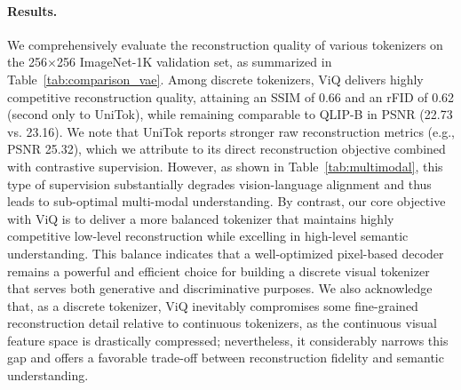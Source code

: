 \paragraph{Results.}
We comprehensively evaluate the reconstruction quality of various tokenizers on the 256$\times$256 ImageNet-1K validation set, as summarized in Table~\ref{tab:comparison_vae}.
Among discrete tokenizers, ViQ delivers highly competitive reconstruction quality, attaining an SSIM of 0.66 and an rFID of 0.62 (second only to UniTok), while remaining comparable to QLIP-B in PSNR (22.73 vs. 23.16). We note that UniTok reports stronger raw reconstruction metrics (e.g., PSNR 25.32), which we attribute to its direct reconstruction objective combined with contrastive supervision. However, as shown in Table~\ref{tab:multimodal}, this type of supervision substantially degrades vision-language alignment and thus leads to sub-optimal multi-modal understanding. By contrast, our core objective with ViQ is to deliver a more balanced tokenizer that maintains highly competitive low-level reconstruction while excelling in high-level semantic understanding.
This balance indicates that a well-optimized pixel-based decoder remains a powerful and efficient choice for building a discrete visual tokenizer that serves both generative and discriminative purposes.
We also acknowledge that, as a discrete tokenizer, ViQ inevitably compromises some fine-grained reconstruction detail relative to continuous tokenizers, as the continuous visual feature space is drastically compressed; nevertheless, it considerably narrows this gap and offers a favorable trade-off between reconstruction fidelity and semantic understanding.

